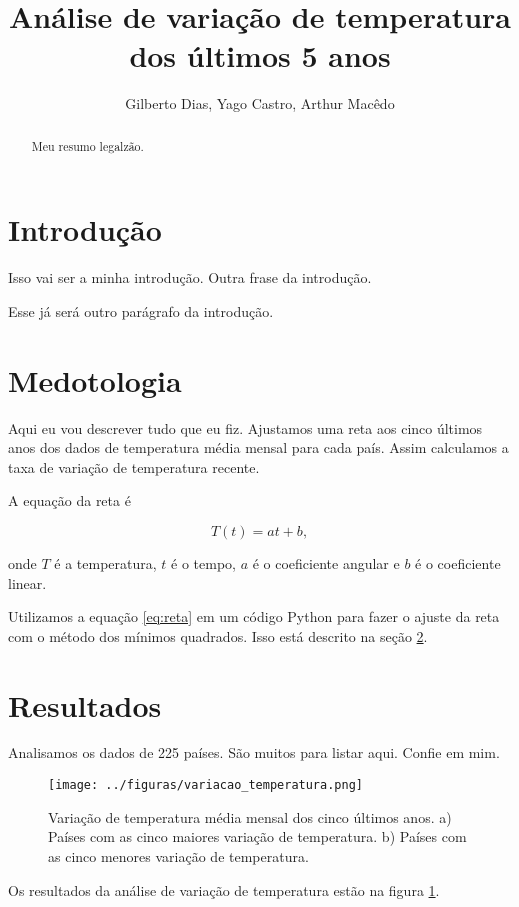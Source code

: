 \documentclass{article}
\begin{document}

\title{Análise de variação de temperatura dos últimos 5 anos}
\author{Gilberto Dias, Yago Castro, Arthur Macêdo}

\maketitle

\begin{abstract}
Meu resumo legalzão.
\end{abstract}

\section{Introdução}
Isso vai ser a minha introdução. 
Outra frase da introdução. 

Esse já será outro parágrafo da introdução.

\section{Medotologia}
\label{sec:metodos}

Aqui eu vou descrever tudo que eu fiz.
Ajustamos uma reta aos cinco últimos anos dos dados
de temperatura média mensal para cada país.
Assim calculamos a taxa de variação de temperatura recente. 

A equação da reta é


\begin{equation}
T (t) = a t + b,
\label{eq:reta}
\end{equation}

\noindent
onde $T$ é a temperatura, $t$ é o tempo, $a$ é o coeficiente angular e 
$b$ é o coeficiente linear.

Utilizamos a equação \ref{eq:reta} em um código Python para fazer o ajuste da
reta com o método dos mínimos quadrados. Isso está descrito na seção \ref{sec:metodos}.

\section{Resultados}

Analisamos os dados de 225 países. São muitos para listar aqui. Confie em mim.

\begin{figure}[htb]
	\centering
	\texttt{[image: ../figuras/variacao\_temperatura.png]}
	\caption{
		Variação de temperatura média mensal dos cinco últimos anos.
		a) Países com as cinco maiores variação de temperatura.
		b) Países com as cinco menores variação de temperatura.
	}
	\label{fig:variacao}
\end{figure}

Os resultados da análise de variação de temperatura estão na figura \ref{fig:variacao}.
\end{document}
